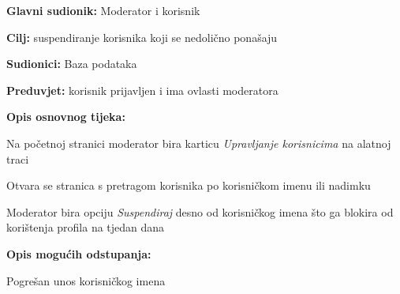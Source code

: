 					\noindent {}
					\begin{packed_item}
						
						\item \textbf{Glavni sudionik: }Moderator i korisnik
						\item  \textbf{Cilj:} suspendiranje korisnika koji se nedolično ponašaju
						\item  \textbf{Sudionici:}
						Baza podataka
						\item  \textbf{Preduvjet:} korisnik prijavljen i ima ovlasti moderatora
						\item  \textbf{Opis osnovnog tijeka:}
						
						\item[] \begin{packed_enum}
							
							\item	Na početnoj stranici moderator bira karticu \textit{Upravljanje korisnicima} na alatnoj traci
							\item	Otvara se stranica s pretragom korisnika po korisničkom imenu ili nadimku
							\item	Moderator bira opciju \textit{Suspendiraj} desno od korisničkog imena što ga blokira od korištenja profila na tjedan dana
							
						\end{packed_enum}
						
						\item  \textbf{Opis mogućih odstupanja:}
						
						\item[] \begin{packed_item}
							
							\item[2.a] Pogrešan unos korisničkog imena
							
						\end{packed_item}
					\end{packed_item}
					
